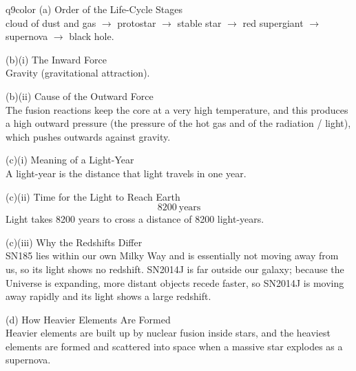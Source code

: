 \documentclass[11pt,a4paper]{article}
\begin{document}
\begin{ansbox}{q9color}
(a) Order of the Life-Cycle Stages\\[4pt]
cloud of dust and gas $\rightarrow$ protostar $\rightarrow$ stable star $\rightarrow$ red supergiant $\rightarrow$ supernova $\rightarrow$ black hole.

\vspace{4pt}
(b)(i) The Inward Force\\[4pt]
Gravity (gravitational attraction).

\vspace{4pt}
(b)(ii) Cause of the Outward Force\\[4pt]
The fusion reactions keep the core at a very high temperature, and this produces a high outward pressure (the pressure of the hot gas and of the radiation / light), which pushes outwards against gravity.

\vspace{4pt}
(c)(i) Meaning of a Light-Year\\[4pt]
A light-year is the distance that light travels in one year.

\vspace{4pt}
(c)(ii) Time for the Light to Reach Earth\\[4pt]
\[ \boxed{8200\ \text{years}} \]
Light takes 8200 years to cross a distance of 8200 light-years.

\vspace{4pt}
(c)(iii) Why the Redshifts Differ\\[4pt]
SN185 lies within our own Milky Way and is essentially not moving away from us, so its light shows no redshift. SN2014J is far outside our galaxy; because the Universe is expanding, more distant objects recede faster, so SN2014J is moving away rapidly and its light shows a large redshift.

\vspace{4pt}
(d) How Heavier Elements Are Formed\\[4pt]
Heavier elements are built up by nuclear fusion inside stars, and the heaviest elements are formed and scattered into space when a massive star explodes as a supernova.
\end{ansbox}
\end{document}
